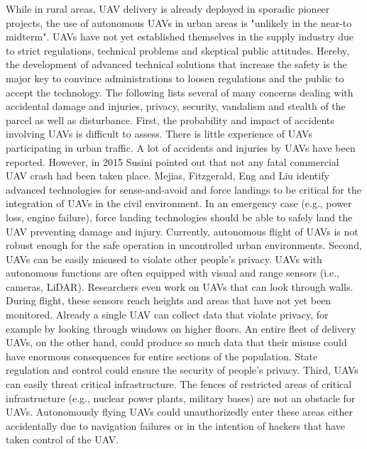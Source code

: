While in rural areas, UAV delivery is already deployed in sporadic pioneer projects, 
the use of autonomous UAVs in urban areas is "unlikely in the near-to midterm". \cite{Bouton2017}
UAVs have not yet established themselves in the supply industry 
due to strict regulations, technical problems and skeptical public attitudes. \cite{Rosen2019}
Hereby, the development of advanced technical solutions that increase the safety is the major key
to convince administrations to loosen regulations and the public to accept the technology. \cite{Intech2009}
The following lists several of many concerns dealing with accidental damage and injuries, 
privacy, security, vandalism and stealth of the parcel as well as disturbance.
First, the probability and impact of accidents involving UAVs is difficult to assess.
There is little experience of UAVs participating in urban traffic.
A lot of accidents and injuries by UAVs have been reported. \cite{Forrest2018}
However, in 2015 Susini \cite{Susini2015} pointed out that not any fatal commercial UAV crash had been taken place.
Mejias, Fitzgerald, Eng and Liu \cite{Intech2009} identify
advanced technologies for sense-and-avoid and force landings to be critical for the integration of UAVs in the civil environment.
In an emergency case (e.g., power loss, engine failure), 
force landing technologies should be able to safely land the UAV preventing damage and injury.
Currently, autonomous flight of UAVs is not robust enough for the safe operation in uncontrolled urban environments. \cite{loquercio2018learning}
Second, UAVs can be easily misused to violate other people's privacy.
UAVs with autonomous functions are often equipped with visual and range sensors (i.e., cameras, LiDAR).
Researchers even work on UAVs that can look through walls. \cite{Biggs2017}
During flight, these sensors reach heights and areas that have not yet been monitored.
Already a single UAV can collect data that violate privacy, for example by looking through windows on higher floors.
An entire fleet of delivery UAVs, on the other hand, could produce so much data that their misuse could have enormous consequences for
entire sections of the population.
State regulation and control could ensure the security of people's privacy.
Third, UAVs can easily threat critical infrastructure.
The fences of restricted areas of critical infrastructure (e.g., nuclear power plants, military bases) are not an obstacle for UAVs.
Autonomously flying UAVs could unauthorizedly enter these areas either accidentally due to navigation failures
or in the intention of hackers that have taken control of the UAV.
